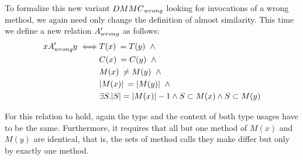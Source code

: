 
To formalize this new variant $\mathnormal{DMMC}_{\mathnormal{wrong}}$ looking for invocations of a wrong method, we again need only change the definition of almost similarity.
This time we define a new relation $A'_{\mathnormal{wrong}}$ as follows:
\begin{align*}
xA'_{\mathnormal{wrong}}y \iff & T(x) \: = T(y) \;\; \land \\
                                & C(x) \: = C(y) \;\; \land \\
                                & M(x) \: \neq M(y) \;\; \land \\
                                & |M(x)| \:  = |M(y)| \;\; \land \\
                                & \exists S . |S| = |M(x)| - 1 \land S \subset M(x) \land S \subset M(y)
\end{align*}

For this relation to hold, again the type and the context of both type usages have to be the same.
Furthermore, it requires that all but one method of $M(x)$ and $M(y)$ are identical, that is, the sets of method calls they make differ but only by exactly one method.



